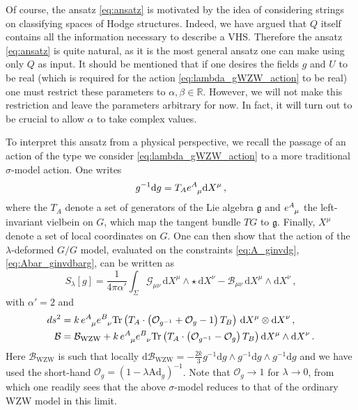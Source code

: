 \documentclass[11pt,a4paper]{article}
\numberwithin{equation}{section}
\numberwithin{table}{section}\setlength{\multlinegap}{25pt}
\newcommand{\dd}{\mathrm{d}}
\begin{document}
Of course, the ansatz \eqref{eq:ansatz} is motivated by the idea of considering strings on classifying spaces of Hodge structures. Indeed, we have argued that $Q$ itself contains all the information necessary to describe a VHS. Therefore the ansatz \eqref{eq:ansatz} is quite natural, as it is the most general ansatz one can make using only $Q$ as input. It should be mentioned that if one desires the fields $g$ and $U$ to be real (which is required for the action \eqref{eq:lambda_gWZW_action} to be real) one must restrict these parameters to $\alpha,\beta\in\mathbb{R}$. However, we will not make this restriction and leave the parameters arbitrary for now. In fact, it will turn out to be crucial to allow $\alpha$ to take complex values.

To interpret this ansatz from a physical perspective, we recall the passage of an action of the type we consider \eqref{eq:lambda_gWZW_action} to a more traditional $\sigma$-model action. One writes
\begin{equation}\label{eq:g_to_X}
	g^{-1}\dd g = T_A \tensor{e}{^A_\mu}\dd X^\mu\,,
\end{equation}
where the $T_A$ denote a set of generators of the Lie algebra $\mathfrak{g}$ and $\tensor{e}{^A_\mu}$ the left-invariant	 vielbein on $G$, which map the tangent bundle $TG$ to $\mathfrak{g}$. Finally, $X^\mu$ denote a set of local coordinates on $G$. One can then show that the action of the $\lambda$-deformed $G/G$ model, evaluated on the constraints \eqref{eq:A_ginvdg},\eqref{eq:Abar_ginvdbarg}, can be written as \cite{Driezen:2018glg}
\begin{equation}\label{eq:sigma_model}
	S_\lambda[g] = \frac{1}{4\pi\alpha'}\int_\Sigma \mathcal{G}_{\mu\nu}\,\dd X^\mu\wedge\star \,\dd X^\nu-\mathcal{B}_{\mu\nu} \,\dd X^\mu\wedge \dd X^\nu\,,
\end{equation}
with $\alpha'=2$ and
\begin{align}
	ds^2 &= k\,\tensor{e}{^A_\mu}\tensor{e}{^B_\nu} \mathrm{Tr}\left(T_A\cdot\left(\mathcal{O}_{g^{-1}}+\mathcal{O}_g-1\right)T_B\right)\,\dd X^\mu\otimes\dd X^\nu\,,\\
	\mathcal{B} &= \mathcal{B}_{\mathrm{WZW}}+k \,\tensor{e}{^A_\mu}\tensor{e}{^B_\nu}\mathrm{Tr}\left(T_A\cdot\left(\mathcal{O}_{g^{-1}}-\mathcal{O}_g\right)T_B\right)\dd X^\mu\wedge\dd X^\nu\,.
\end{align}
Here $\mathcal{B}_{\mathrm{WZW}}$ is such that locally $\dd \mathcal{B}_{\mathrm{WZW}} = -\frac{2k}{3}g^{-1}\dd g\wedge g^{-1}\dd g\wedge g^{-1}\dd g$ and we have used the short-hand $\mathcal{O}_g = (1-\lambda\mathrm{Ad}_g)^{-1}$. Note that $\mathcal{O}_g\rightarrow 1$ for $\lambda\rightarrow 0$, from which one readily sees that the above $\sigma$-model reduces to that of the ordinary WZW model in this limit. 
\end{document}
